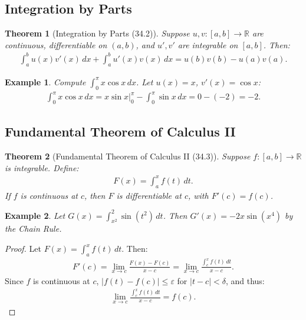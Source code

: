 \documentclass[9pt]{article}
\theoremstyle{definition}
\theoremstyle{plain}
\newtheorem{theorem}{Theorem}
\newtheorem{example}{Example}
\begin{document}
\subsection*{Integration by Parts}
\begin{theorem}[Integration by Parts (34.2)]
Suppose $ u, v : [a, b] \to \mathbb{R} $ are continuous, differentiable on $ (a, b) $, and $ u', v' $ are integrable on $ [a, b] $. Then:
\begin{align}
\int_a^b u(x)v'(x) \, dx + \int_a^b u'(x)v(x) \, dx = u(b)v(b) - u(a)v(a).
\end{align}
\end{theorem}

\begin{example}
Compute $ \int_0^\pi x \cos x \, dx $. Let $ u(x) = x $, $ v'(x) = \cos x $:
\begin{align}
\int_0^\pi x \cos x \, dx = x \sin x \big|_0^\pi - \int_0^\pi \sin x \, dx = 0 - (-2) = -2.
\end{align}
\end{example}

\subsection*{Fundamental Theorem of Calculus II}
\begin{theorem}[Fundamental Theorem of Calculus II (34.3)]
Suppose $ f : [a, b] \to \mathbb{R} $ is integrable. Define:
\begin{align}
F(x) = \int_a^x f(t) \, dt.
\end{align}
If $ f $ is continuous at $ c $, then $ F $ is differentiable at $ c $, with $ F'(c) = f(c) $.
\end{theorem}

\begin{example}
Let $ G(x) = \int_{x^2}^2 \sin(t^2) \, dt $. Then $ G'(x) = -2x \sin(x^4) $ by the Chain Rule.
\end{example}

\begin{proof}
Let $ F(x) = \int_a^x f(t) \, dt $. Then:
\begin{align}
F'(c) = \lim_{x \to c} \frac{F(x) - F(c)}{x - c} = \lim_{x \to c} \frac{\int_c^x f(t) \, dt}{x - c}.
\end{align}
Since $ f $ is continuous at $ c $, $ |f(t) - f(c)| \leq \varepsilon $ for $ |t - c| < \delta $, and thus:
\begin{align}
\lim_{x \to c} \frac{\int_c^x f(t) \, dt}{x - c} = f(c).
\end{align}
\end{proof}
\end{document}
